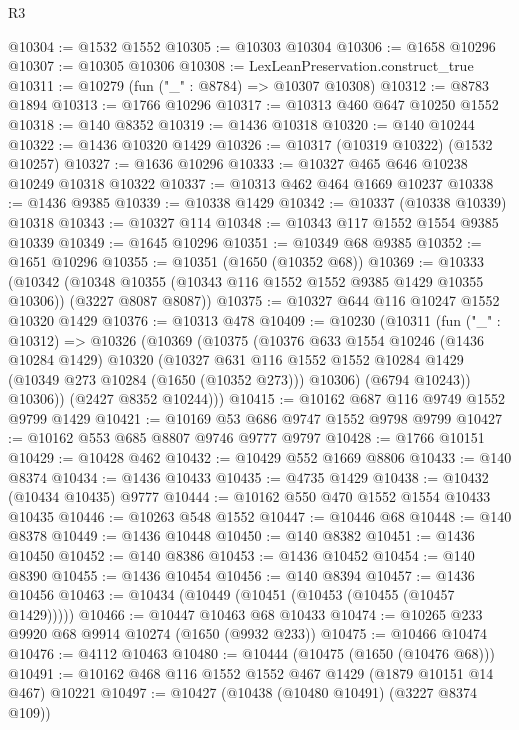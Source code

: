 \begin{lexlean}{R3}
\begin{coremodule}
@10304 := @1532 @1552
@10305 := @10303 @10304
@10306 := @1658 @10296
@10307 := @10305 @10306
@10308 := LexLeanPreservation.construct_true
@10311 := @10279 (fun ("_" : @8784) => @10307 @10308)
@10312 := @8783 @1894
@10313 := @1766 @10296
@10317 := @10313 @460 @647 @10250 @1552
@10318 := @140 @8352
@10319 := @1436 @10318
@10320 := @140 @10244
@10322 := @1436 @10320 @1429
@10326 := @10317 (@10319 @10322) (@1532 @10257)
@10327 := @1636 @10296
@10333 := @10327 @465 @646 @10238 @10249 @10318 @10322
@10337 := @10313 @462 @464 @1669 @10237
@10338 := @1436 @9385
@10339 := @10338 @1429
@10342 := @10337 (@10338 @10339) @10318
@10343 := @10327 @114
@10348 := @10343 @117 @1552 @1554 @9385 @10339
@10349 := @1645 @10296
@10351 := @10349 @68 @9385
@10352 := @1651 @10296
@10355 := @10351 (@1650 (@10352 @68))
@10369 := @10333
    (@10342 (@10348 @10355 (@10343 @116 @1552 @1552 @9385 @1429 @10355 @10306)) (@3227 @8087 @8087))
@10375 := @10327 @644 @116 @10247 @1552 @10320 @1429
@10376 := @10313 @478
@10409 := @10230
    (@10311
      (fun ("_" : @10312) =>
      @10326
        (@10369
          (@10375
            (@10376
              @633
              @1554
              @10246
              (@1436 @10284 @1429)
              @10320
              (@10327
                @631
                @116
                @1552
                @1552
                @10284
                @1429
                (@10349 @273 @10284 (@1650 (@10352 @273)))
                @10306)
              (@6794 @10243))
            @10306))
        (@2427 @8352 @10244)))
@10415 := @10162 @687 @116 @9749 @1552 @9799 @1429
@10421 := @10169 @53 @686 @9747 @1552 @9798 @9799
@10427 := @10162 @553 @685 @8807 @9746 @9777 @9797
@10428 := @1766 @10151
@10429 := @10428 @462
@10432 := @10429 @552 @1669 @8806
@10433 := @140 @8374
@10434 := @1436 @10433
@10435 := @4735 @1429
@10438 := @10432 (@10434 @10435) @9777
@10444 := @10162 @550 @470 @1552 @1554 @10433 @10435
@10446 := @10263 @548 @1552
@10447 := @10446 @68
@10448 := @140 @8378
@10449 := @1436 @10448
@10450 := @140 @8382
@10451 := @1436 @10450
@10452 := @140 @8386
@10453 := @1436 @10452
@10454 := @140 @8390
@10455 := @1436 @10454
@10456 := @140 @8394
@10457 := @1436 @10456
@10463 := @10434 (@10449 (@10451 (@10453 (@10455 (@10457 @1429)))))
@10466 := @10447 @10463 @68 @10433
@10474 := @10265 @233 @9920 @68 @9914 @10274 (@1650 (@9932 @233))
@10475 := @10466 @10474
@10476 := @4112 @10463
@10480 := @10444 (@10475 (@1650 (@10476 @68)))
@10491 := @10162 @468 @116 @1552 @1552 @467 @1429 (@1879 @10151 @14 @467) @10221
@10497 := @10427 (@10438 (@10480 @10491) (@3227 @8374 @109))

\end{coremodule}
\end{lexlean}
